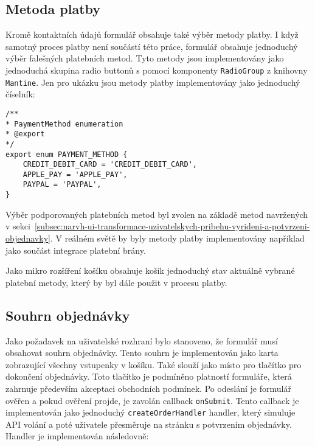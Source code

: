 \subsection{Metoda platby}
\label{subsec:implementace-checkout-payment-method}
Kromě kontaktních údajů formulář obsahuje také výběr metody platby.
I když samotný proces platby není součástí této práce, formulář obsahuje jednoduchý výběr falešných platebních metod.
Tyto metody jsou implementovány jako jednoduchá skupina radio buttonů s pomocí komponenty \texttt{RadioGroup} z knihovny \texttt{Mantine}.
Jen pro ukázku jsou metody platby implementovány jako jednoduchý číselník:

\begin{verbatim}
/**
* PaymentMethod enumeration
* @export
*/
export enum PAYMENT_METHOD {
	CREDIT_DEBIT_CARD = 'CREDIT_DEBIT_CARD',
	APPLE_PAY = 'APPLE_PAY',
	PAYPAL = 'PAYPAL',
}
\end{verbatim}

Výběr podporovaných platebních metod byl zvolen na základě metod navržených v sekci~\ref{subsec:narvh-ui-transformace-uzivatelskych-pribehu-vyrideni-a-potvrzeni-objednavky}.
V reálném světě by byly metody platby implementovány například jako součást integrace platební brány.

Jako mikro rozšíření košíku obsahuje košík jednoduchý stav aktuálně vybrané platební metody, který by byl dále použit v procesu platby.

\subsection{Souhrn objednávky}
\label{subsec:implementace-checkout-souhrn}
Jako požadavek na uživatelské rozhraní bylo stanoveno, že formulář musí obsahovat souhrn objednávky.
Tento souhrn je implementován jako karta zobrazující všechny vstupenky v košíku.
Také slouží jako místo pro tlačítko pro dokončení objednávky.
Toto tlačítko je podmíněno platností formuláře, která zahrnuje především akceptaci obchodních podmínek.
Po odeslání je formulář ověřen a pokud ověření projde, je zavolán callback \texttt{onSubmit}.
Tento callback je implementován jako jednoduchý \texttt{createOrderHandler} handler, který simuluje API volání a poté uživatele přesměruje na stránku s potvrzením objednávky.
Handler je implementován následovně:

